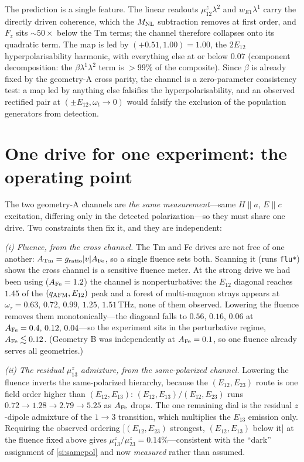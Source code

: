 \documentclass[11pt]{article}
\newcommand{\qafm}{q_{\rm AFM}}
\newcommand{\Mnl}{M_{\rm NL}}
\begin{document}
The prediction is a single feature.  The linear readouts
$\mu^z_{12}\lambda^2$ and $w_{E1}\lambda^1$ carry the directly driven
coherence, which the $\Mnl$ subtraction removes at first order, and
$F_z$ sits $\sim\!50\times$ below the Tm terms; the channel therefore
collapses onto its quadratic term.  The map is led by
$(+0.51,1.00)=1.00$, the $2E_{12}$ hyperpolarisability harmonic, with
everything else at or below $0.07$ (component decomposition: the
$\beta\lambda^1\lambda^2$ term is $>\!99\%$ of the composite).  Since
$\beta$ is already fixed by the geometry-A cross parity, the channel is
a zero-parameter consistency test: a map led by anything else falsifies
the hyperpolarisability, and an observed rectified pair at
$(\pm E_{12},\omega_t\!\to\!0)$ would falsify the exclusion of the
population generators from detection.

\section{One drive for one experiment: the operating point}
\label{si:operating}

The two geometry-A channels are \emph{the same measurement}---same
$H\parallel a$, $E\parallel c$ excitation, differing only in the
detected polarization---so they must share one drive.  Two constraints
then fix it, and they are independent:

\emph{(i) Fluence, from the cross channel.}  The Tm and Fe drives are
not free of one another: $A_{\rm Tm}=g_{\rm ratio}|v|A_{\rm Fe}$, so a
single fluence sets both.  Scanning it (runs \texttt{flu*}) shows the
cross channel is a sensitive fluence meter.  At the strong drive we had
been using ($A_{\rm Fe}=1.2$) the channel is nonperturbative: the
$E_{12}$ diagonal reaches $1.45$ of the $(\qafm,E_{12})$ peak and a
forest of multi-magnon strays appears at
$\omega_\tau=0.63,\,0.72,\,0.99,\,1.25,\,1.51$\,THz, none of them
observed.  Lowering the fluence removes them monotonically---the
diagonal falls to $0.56$, $0.16$, $0.06$ at
$A_{\rm Fe}=0.4,\,0.12,\,0.04$---so the experiment sits in the
perturbative regime, $A_{\rm Fe}\lesssim0.12$.  (Geometry B was
independently at $A_{\rm Fe}=0.1$, so one fluence already serves all
geometries.)

\emph{(ii) The residual $\mu^z_{13}$ admixture, from the
same-polarized channel.}  Lowering the fluence inverts the
same-polarized hierarchy, because the $(E_{12},E_{23})$ route is one
field order higher than $(E_{12},E_{13})$:
$(E_{12},E_{13})/(E_{12},E_{23})$ runs $0.72\to1.28\to2.79\to5.25$ as
$A_{\rm Fe}$ drops.  The one remaining dial is the residual $z$-dipole
admixture of the $1\!\to\!3$ transition, which multiplies the $E_{13}$
emission only.  Requiring the observed ordering
[$(E_{12},E_{23})$ strongest, $(E_{12},E_{13})$ below it] at the
fluence fixed above gives $\mu^z_{13}/\mu^z_{23}=0.14\%$---consistent
with the ``dark'' assignment of \cref{si:samepol} and now
\emph{measured} rather than assumed.
\end{document}
